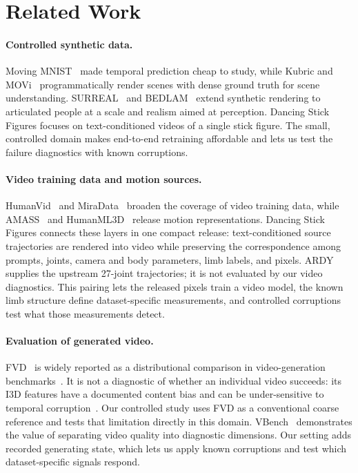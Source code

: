 \documentclass[10pt,twocolumn]{article}
\begin{document}
\section{Related Work}

\paragraph{Controlled synthetic data.} Moving MNIST~\cite{srivastava2015unsupervised} made temporal
prediction cheap to study, while Kubric and MOVi~\cite{greff2022kubric} programmatically render scenes with
dense ground truth for scene understanding. SURREAL~\cite{varol2017surreal} and BEDLAM~\cite{black2023bedlam}
extend synthetic rendering to articulated people at a scale and realism aimed at perception. Dancing Stick
Figures focuses on text-conditioned videos of a single stick figure. The small, controlled domain makes
end-to-end retraining affordable and lets us test the failure diagnostics with known corruptions.

\paragraph{Video training data and motion sources.} HumanVid~\cite{wang2024humanvid} and
MiraData~\cite{ju2024miradata} broaden the coverage of video training data, while
AMASS~\cite{mahmood2019amass} and HumanML3D~\cite{guo2022humanml3d} release motion representations. Dancing
Stick Figures connects these layers in one compact release: text-conditioned source trajectories are
rendered into video while preserving the correspondence among prompts, joints, camera and body parameters,
limb labels, and pixels. ARDY~\cite{zhao2026ardy} supplies the upstream 27-joint trajectories; it is not
evaluated by our video diagnostics. This pairing lets the released pixels train a video model, the known
limb structure define dataset-specific measurements, and controlled corruptions test what those measurements
detect.

\paragraph{Evaluation of generated video.} FVD~\cite{unterthiner2018fvd} is widely reported as a
distributional comparison in video-generation benchmarks~\cite{ho2022vdm}. It is not a
diagnostic of whether an individual video succeeds: its I3D features have a documented content bias and can
be under-sensitive to temporal corruption~\cite{ge2024fvdbias}. Our controlled study uses FVD as a
conventional coarse reference and tests that limitation directly in this domain.
VBench~\cite{huang2023vbench} demonstrates the value of separating video quality into diagnostic dimensions.
Our setting adds recorded generating state, which lets us apply known corruptions and test which
dataset-specific signals respond.
\end{document}
